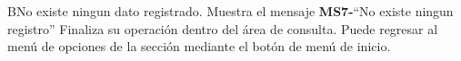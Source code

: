 \begin{UCtrayectoriaA}{B}{No existe ningun dato registrado.}
			\UCpaso[\UCactor] Muestra el mensaje {\bf MS7-}``No existe ningun registro''
			\UCpaso[\UCactor] Finaliza su operación dentro del área de consulta. 
			\UCpaso[\UCactor] Puede regresar al menú de opciones de la sección  mediante el botón de menú de inicio.
		\end{UCtrayectoriaA}


